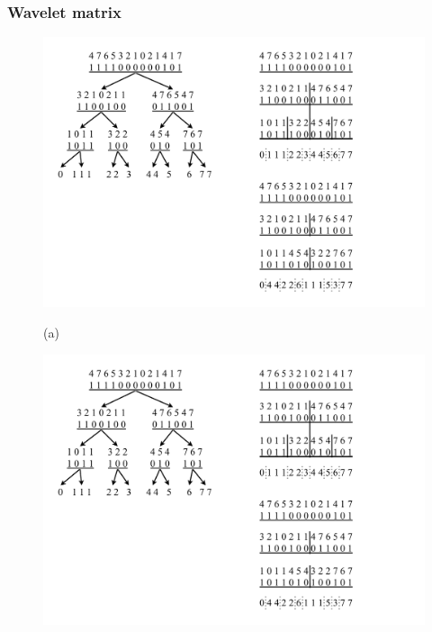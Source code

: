 \begin{frame}
\frametitle{Wavelet matrix}

\begin{figure}%
    	\centering
    	\begin{minipage}{0.3\textwidth}
    		\centering
    		\includegraphics[scale=.3, clip,  trim=30 280 440 30]{../img/arte/graphs-wavelet-matrix.pdf}
    		
    		(a)
    	\end{minipage}
    	\begin{minipage}{0.3\textwidth}
    		\centering
    		\includegraphics[scale=.3, clip, trim=470 320 170 30]{../img/arte/graphs-wavelet-matrix.pdf}


\end{minipage}
\end{figure}
\end{frame}
